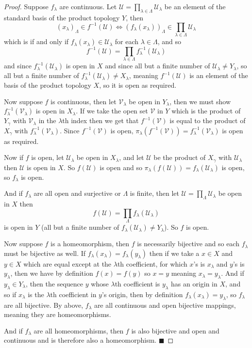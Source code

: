 \documentclass[10pt]{article}
\def\qed{\hskip1cm\penalty-100\hbox{}\hfill$\blacksquare$}
\def\mU{\mathcal{U}}
\def\mV{\mathcal{V}}
\begin{document}
\begin{proof}

    Suppose $f_\lambda$ are continuous.
    Let $\mU=\prod_{\lambda\in\Lambda}\mU_\lambda$ be an element of the standard basis of the product topology $Y$, then
    \[ (x_\lambda)_\Lambda\in f^{-1}(\mU) \iff (f_\lambda(x_\lambda))_\Lambda\in\prod_{\lambda\in\Lambda}\mU_\lambda \]
    which is if and only if $f_\lambda(x_\lambda)\in\mU_\lambda$ for each $\lambda\in\Lambda$, and so
    \[ f^{-1}(\mU) = \prod_{\lambda\in\Lambda}f^{-1}_\lambda(\mU_\lambda) \]
    and since $f^{-1}_\lambda(\mU_\lambda)$ is open in $X$ and since all but a finite number of $\mU_\lambda\neq Y_\lambda$, so all but a finite number of $f^{-1}_\lambda(\mU_\lambda)\neq X_\lambda$,
    meaning $f^{-1}(\mU)$ is an element of the basis of the product topology $X$, so it is open as required.

    Now suppose $f$ is continuous, then let $\mV_\lambda$ be open in $Y_\lambda$, then we must show $f_\lambda^{-1}(\mV_\lambda)$ is open in $X_\lambda$.
    If we take the open set $\mV$ in $Y$ which is the product of $Y_\gamma$ with $\mV_\lambda$ in the $\lambda$th index then we get that $f^{-1}(\mV)$ is equal to the product of $X_\gamma$ with
    $f_\lambda^{-1}(\mV_\lambda)$.
    Since $f^{-1}(\mV)$ is open, $\pi_\lambda(f^{-1}(\mV))=f_\lambda^{-1}(\mV_\lambda)$ is open as required.

    Now if $f$ is open, let $\mU_\lambda$ be open in $X_\lambda$, and let $\mU$ be the product of $X_\gamma$ with $\mU_\lambda$ then $\mU$ is open in $X$.
    So $f(\mU)$ is open and so $\pi_\lambda(f(\mU))=f_\lambda(\mU_\lambda)$ is open, so $f_\lambda$ is open.

    And if $f_\lambda$ are all open and surjective or $\Lambda$ is finite, then let $\mU=\prod_\Lambda\mU_\lambda$ be open in $X$ then
    \[ f(\mU) = \prod_\Lambda f_\lambda(\mU_\lambda) \]
    is open in $Y$ (all but a finite number of $f_\lambda(\mU_\lambda)\neq Y_\lambda$).
    So $f$ is open.

    Now suppose $f$ is a homeomorphism, then $f$ is necessarily bijective and so each $f_\lambda$ must be bijective as well.
    If $f_\lambda(x_\lambda)=f_\lambda(y_\lambda)$ then if we take a $x\in X$ and $y\in X$ which are equal except at the $\lambda$th coefficient, for which $x$'s is $x_\lambda$ and $y$'s is $y_\lambda$, then
    we have by definition $f(x)=f(y)$ so $x=y$ meaning $x_\lambda=y_\lambda$.
    And if $y_\lambda\in Y_\lambda$, then the sequence $y$ whose $\lambda$th coefficient is $y_\lambda$ has an origin in $X$, and so if $x_\lambda$ is the $\lambda$th coefficient in $y$'s origin, then by
    definition $f_\lambda(x_\lambda)=y_\lambda$, so $f_\lambda$ are all bijective.
    By above, $f_\lambda$ are all continuous and open bijective mappings, meaning they are homeomorphisms.

    And if $f_\lambda$ are all homeomorphisms, then $f$ is also bijective and open and continuous and is therefore also a homeomorphism.
    \qed
    
\end{proof}
\end{document}
